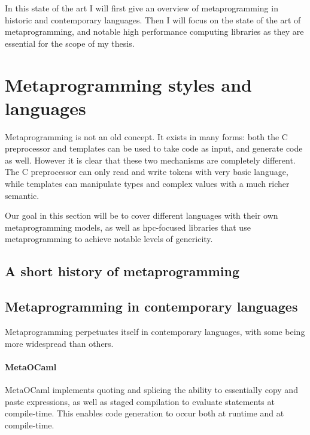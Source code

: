\documentclass[../main]{subfiles}
\begin{document}

In this state of the art I will first give an overview of metaprogramming in
historic and contemporary languages. Then I will focus on the state of the art
of \cpp metaprogramming, and notable high performance computing libraries as they
are essential for the scope of my thesis.

\section{
  Metaprogramming styles and languages
}

Metaprogramming is not an old concept. It exists in many forms:
both the C preprocessor and \cpp templates can be used to take code as input,
and generate code as well.
However it is clear that these two mechanisms are completely different.
The C preprocessor can only read and write tokens with very basic language,
while \cpp templates can manipulate types and complex \cpp values
with a much richer semantic.

Our goal in this section will be to cover different languages with their own
metaprogramming models, as well as \gls{hpc}-focused libraries that use
metaprogramming to achieve notable levels of genericity.

\subsection{A short history of metaprogramming}


\subsection{Metaprogramming in contemporary languages}

Metaprogramming perpetuates itself in contemporary languages,
with some being more widespread than others.

\paragraph{MetaOCaml}

MetaOCaml\cite{metaocaml} implements quoting and splicing
\ie the ability to essentially copy and paste expressions,
as well as staged compilation to evaluate statements at compile-time.
This enables code generation to occur both at runtime and at compile-time.
\end{document}
